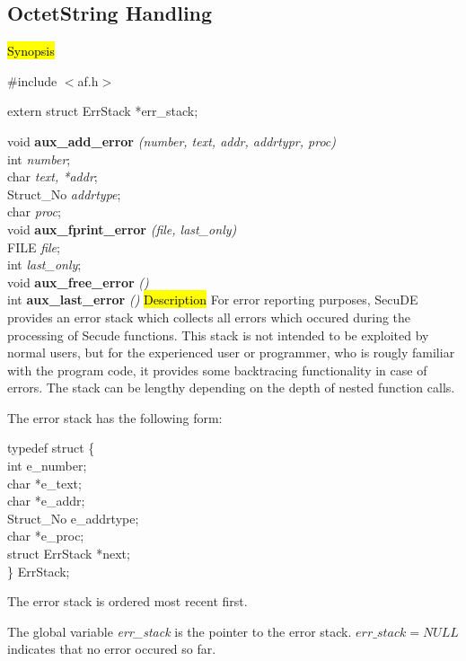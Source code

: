 \subsection{OctetString Handling}
\label{aux_error}
\hl{Synopsis}

\#include $<$af.h$>$ 


extern struct ErrStack *err\_stack; 


void {\bf aux\_add\_error} {\em (number, text, addr, addrtypr, proc)} \\
int {\em number}; \\
char {\em *text, *addr}; \\
Struct\_No {\em addrtype}; \\
char {\em *proc}; \\ [1em]
void {\bf aux\_fprint\_error} {\em (file, last\_only)} \\
FILE {\em *file}; \\
int {\em last\_only}; \\ [1em]
void {\bf aux\_free\_error} {\em ()} \\ [1em]
int {\bf aux\_last\_error} {\em ()}
\hl{Description}
For error reporting purposes, SecuDE provides an error stack which collects all
errors which occured during the processing of Secude functions. This stack is not
intended to be exploited by normal users, but for the experienced user or programmer,
who is rougly familiar with the program code, it provides some backtracing
functionality in case of errors. The stack can be lengthy depending on the depth
of nested function calls.  

The error stack has the following form: 

\bvtab
\2 typedef struct \{ \\
\4        int  \4            e\_number; \\
\4        char \4           *e\_text;   \\
\4        char \4           *e\_addr;   \\
\4        Struct\_No   \4     e\_addrtype; \\
\4        char \4           *e\_proc;   \\
\4        struct ErrStack  \4 *next;   \\
 \2 \} ErrStack; \\ 
\evtab

The error stack is ordered most recent first.
 
The global variable {\em err\_stack}
is the pointer to the error stack. $err\_stack = NULL$ indicates that no error occured so far.

